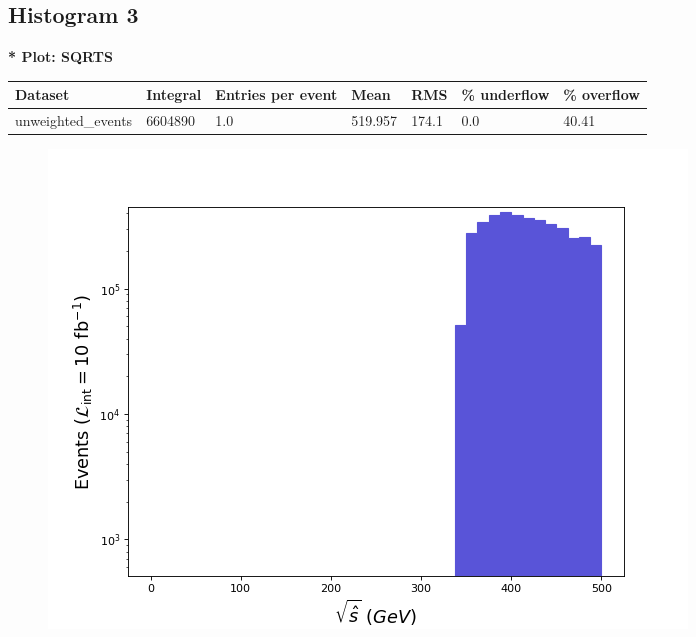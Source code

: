 \documentclass[a4paper, 10pt]{article}
\begin{document}
\subsection{ Histogram 3}

\textbf{* Plot: SQRTS}\\
   \begin{table}[H]
  \begin{center}
    \begin{tabular}{|m{23.0mm}|m{23.0mm}|m{18.0mm}|m{19.0mm}|m{19.0mm}|m{19.0mm}|m{19.0mm}|}
      \hline
      {\cellcolor{yellow}         Dataset}& {\cellcolor{yellow}         Integral}& {\cellcolor{yellow}         Entries per event}& {\cellcolor{yellow}         Mean}& {\cellcolor{yellow}         RMS}& {\cellcolor{yellow}         \% underflow}& {\cellcolor{yellow}         \% overflow}\\
      \hline
      {\cellcolor{white}         unweighted\_events}& {\cellcolor{white}         6604890}& {\cellcolor{white}         1.0}& {\cellcolor{white}         519.957}& {\cellcolor{white}         174.1}& {\cellcolor{red}         0.0}& {\cellcolor{red}         40.41}\\
\hline
    \end{tabular}
  \end{center}
\end{table}

\begin{figure}[H]
  \begin{center}
    \includegraphics[scale=0.45]{selection_2.png}\\
\caption{   }
  \end{center}
\end{figure}
      \newpage
\end{document}
